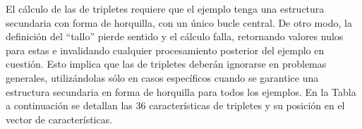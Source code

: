 %
%
El cálculo de las  de tripletes requiere que el ejemplo
tenga una estructura secundaria con forma de horquilla, con un único
bucle central.
De otro modo, la definición del ``tallo'' pierde sentido y el
cálculo falla, retornando valores nulos para estas  e
invalidando cualquier procesamiento posterior del ejemplo en cuestión.
Esto implica que las  de tripletes deberán ignorarse en
problemas generales, utilizándolas sólo en casos específicos cuando se
garantice una estructura secundaria en forma de horquilla para todos
los ejemplos.
En la Tabla a continuación se detallan las $36$ características de
tripletes \cite{xue} y su posición en el vector de características.
